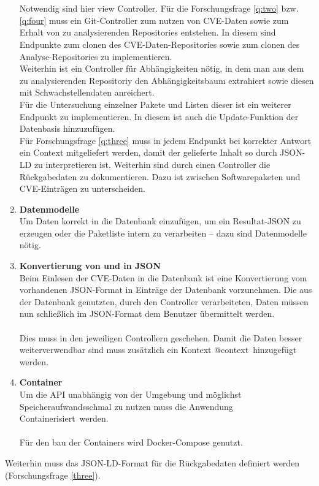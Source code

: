 \begin{enumerate}
            \\ \\
            Notwendig sind hier view Controller.
            Für die Forschungsfrage \ref{q:two} bzw. \ref{q:four} muss ein Git-Controller zum nutzen von CVE-Daten sowie zum Erhalt von zu analysierenden Repositories entstehen.
            In diesem sind Endpunkte zum clonen des CVE-Daten-Repositories sowie zum clonen des Analyse-Repositories zu implementieren. %
            \\
            Weiterhin ist ein Controller für Abhängigkeiten nötig, in dem man aus dem zu analysierenden Repositoriy den Abhängigkeitsbaum extrahiert sowie diesen mit Schwachstellendaten anreichert.
            \\
            Für die Untersuchung einzelner Pakete und Listen dieser ist ein weiterer Endpunkt zu implementieren.
            In diesem ist auch die Update-Funktion der Datenbasis hinzuzufügen.
            \\
            Für Forschungsfrage \ref{q:three} muss in jedem Endpunkt bei korrekter Antwort ein Context mitgeliefert werden, damit der gelieferte Inhalt so durch JSON-LD zu interpretieren ist.
            Weiterhin sind durch einen Controller die Rückgabedaten zu dokumentieren.
            Dazu ist zwischen Softwarepaketen und CVE-Einträgen zu unterscheiden.
        \item \textbf{Datenmodelle} \label{arch_4}\\
            Um Daten korrekt in die Datenbank einzufügen, um ein Resultat-JSON zu erzeugen oder die Paketliste intern zu verarbeiten -- dazu sind Datenmodelle nötig.
        \item \textbf{Konvertierung von und in JSON} \label{arch_5}\\
            Beim Einlesen der CVE-Daten in die Datenbank ist eine Konvertierung vom vorhandenen JSON-Format in Einträge der Datenbank vorzunehmen.  
            Die aus der Datenbank genutzten, durch den Controller verarbeiteten, Daten müssen nun schließlich im JSON-Format dem Benutzer übermittelt werden.
            \\ \\
            Dies muss in den jeweiligen Controllern geschehen.
            Damit die Daten besser weiterverwendbar sind muss zusätzlich ein Kontext \glqq @context\grqq~hinzugefügt werden.
        \item \textbf{Container} \\
            Um die API unabhängig von der Umgebung und möglichst Speicheraufwandsschmal zu nutzen muss die Anwendung \glqq Containerisiert\grqq~werden.
            \\ \\
            Für den bau der Containers wird Docker-Compose genutzt.
    \end{enumerate}
    Weiterhin muss das JSON-LD-Format für die Rückgabedaten definiert werden (Forschungsfrage \ref{three}).